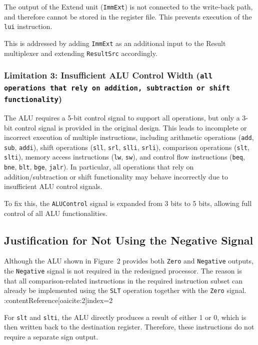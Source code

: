 \documentclass[acmsmall]{acmart}
\begin{document}
The output of the Extend unit (\texttt{ImmExt}) is not connected to the write-back path, and therefore cannot be stored in the register file. This prevents execution of the \texttt{lui} instruction.

This is addressed by adding \texttt{ImmExt} as an additional input to the Result multiplexer and extending \texttt{ResultSrc} accordingly.

\subsubsection{Limitation 3: Insufficient ALU Control Width (\texttt{all operations that rely on addition, subtraction or shift functionality})}

The ALU requires a 5-bit control signal to support all operations, but only a 3-bit control signal is provided in the original design. This leads to incomplete or incorrect execution of multiple instructions, including arithmetic operations (\texttt{add}, \texttt{sub}, \texttt{addi}), shift operations (\texttt{sll}, \texttt{srl}, \texttt{slli}, \texttt{srli}), comparison operations (\texttt{slt}, \texttt{slti}), memory access instructions (\texttt{lw}, \texttt{sw}), and control flow instructions (\texttt{beq}, \texttt{bne}, \texttt{blt}, \texttt{bge}, \texttt{jalr}). In particular, all operations that rely on addition/subtraction or shift functionality may behave incorrectly due to insufficient ALU control signals.

To fix this, the \texttt{ALUControl} signal is expanded from 3 bits to 5 bits, allowing full control of all ALU functionalities.

\subsection{Justification for Not Using the Negative Signal}\label{sect:noNegative}

Although the ALU shown in Figure~2 provides both \texttt{Zero} and \texttt{Negative} outputs, the \texttt{Negative} signal is not required in the redesigned processor. The reason is that all comparison-related instructions in the required instruction subset can already be implemented using the \texttt{SLT} operation together with the \texttt{Zero} signal. :contentReference[oaicite:2]{index=2}

For \texttt{slt} and \texttt{slti}, the ALU directly produces a result of either 1 or 0, which is then written back to the destination register. Therefore, these instructions do not require a separate sign output.
 
\end{document}

